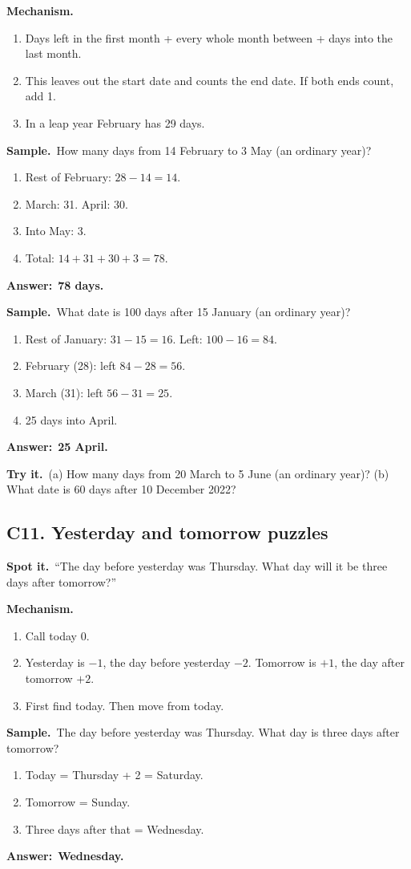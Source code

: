 \documentclass[11pt,a4paper]{article}
\let\oldsubsection\subsection
\renewcommand{\subsection}{\needspace{9\baselineskip}\oldsubsection}
\newcommand{\spot}{\textbf{\color{ember}Spot it.}\ }
\newcommand{\mech}{\textbf{\color{ember}Mechanism.}\ }
\newif\ifkeepsamp
\newcommand{\ans}[1]{\par\nopagebreak\noindent\textbf{\color{ember}Answer:}\ \textbf{#1}\par}
\newcommand{\samp}{\ifkeepsamp\needspace{4\baselineskip}\fi\textbf{\color{ember}Sample.}\ }
\newcommand{\tryit}[1]{\textbf{\color{ember}Try it.}\ #1}
\begin{document}
\mech
\begin{enumerate}
\item Days left in the first month + every whole month between + days into the last month.
\item This leaves out the start date and counts the end date. If both ends count, add 1.
\item In a leap year February has 29 days.
\end{enumerate}

\samp How many days from 14 February to 3 May (an ordinary year)?
\begin{enumerate}
\item Rest of February: $28 - 14 = 14$.
\item March: 31. April: 30.
\item Into May: 3.
\item Total: $14 + 31 + 30 + 3 = 78$.
\end{enumerate}
\ans{78 days.}

\samp What date is 100 days after 15 January (an ordinary year)?
\begin{enumerate}
\item Rest of January: $31 - 15 = 16$. Left: $100 - 16 = 84$.
\item February (28): left $84 - 28 = 56$.
\item March (31): left $56 - 31 = 25$.
\item 25 days into April.
\end{enumerate}
\ans{25 April.}

\tryit (a) How many days from 20 March to 5 June (an ordinary year)? (b) What date is 60 days after 10 December 2022?

\subsection{C11. Yesterday and tomorrow puzzles}
\spot ``The day before yesterday was Thursday. What day will it be three days after tomorrow?''

\mech
\begin{enumerate}
\item Call today 0.
\item Yesterday is $-1$, the day before yesterday $-2$. Tomorrow is $+1$, the day after tomorrow $+2$.
\item First find today. Then move from today.
\end{enumerate}

\samp The day before yesterday was Thursday. What day is three days after tomorrow?
\begin{enumerate}
\item Today = Thursday + 2 = Saturday.
\item Tomorrow = Sunday.
\item Three days after that = Wednesday.
\end{enumerate}
\ans{Wednesday.}
\end{document}
